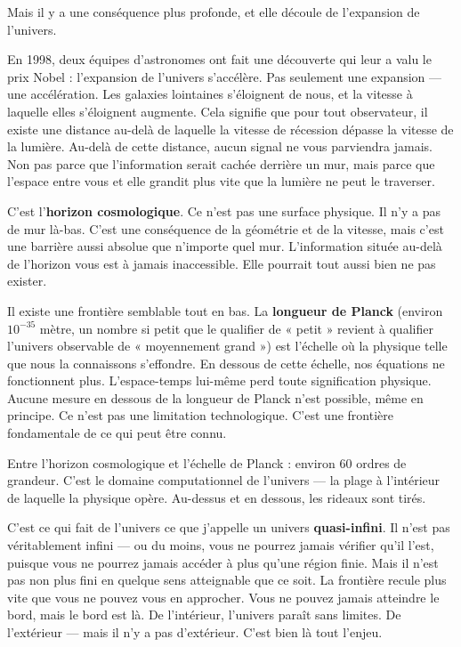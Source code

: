\documentclass[11pt, twoside, openright]{book}
\begin{document}
Mais il y a une conséquence plus profonde, et elle découle de l'expansion de l'univers.

En 1998, deux équipes d'astronomes ont fait une découverte qui leur a valu le prix Nobel : l'expansion de l'univers s'accélère. Pas seulement une expansion --- une accélération. Les galaxies lointaines s'éloignent de nous, et la vitesse à laquelle elles s'éloignent augmente. Cela signifie que pour tout observateur, il existe une distance au-delà de laquelle la vitesse de récession dépasse la vitesse de la lumière. Au-delà de cette distance, aucun signal ne vous parviendra jamais. Non pas parce que l'information serait cachée derrière un mur, mais parce que l'espace entre vous et elle grandit plus vite que la lumière ne peut le traverser.

C'est l'\textbf{horizon cosmologique}. Ce n'est pas une surface physique. Il n'y a pas de mur là-bas. C'est une conséquence de la géométrie et de la vitesse, mais c'est une barrière aussi absolue que n'importe quel mur. L'information située au-delà de l'horizon vous est à jamais inaccessible. Elle pourrait tout aussi bien ne pas exister.

Il existe une frontière semblable tout en bas. La \textbf{longueur de Planck} (environ $10^{-35}$ mètre, un nombre si petit que le qualifier de « petit » revient à qualifier l'univers observable de « moyennement grand ») est l'échelle où la physique telle que nous la connaissons s'effondre. En dessous de cette échelle, nos équations ne fonctionnent plus. L'espace-temps lui-même perd toute signification physique. Aucune mesure en dessous de la longueur de Planck n'est possible, même en principe. Ce n'est pas une limitation technologique. C'est une frontière fondamentale de ce qui peut être connu.

Entre l'horizon cosmologique et l'échelle de Planck : environ 60 ordres de grandeur. C'est le domaine computationnel de l'univers --- la plage à l'intérieur de laquelle la physique opère. Au-dessus et en dessous, les rideaux sont tirés.

C'est ce qui fait de l'univers ce que j'appelle un univers \textbf{quasi-infini}. Il n'est pas véritablement infini --- ou du moins, vous ne pourrez jamais vérifier qu'il l'est, puisque vous ne pourrez jamais accéder à plus qu'une région finie. Mais il n'est pas non plus fini en quelque sens atteignable que ce soit. La frontière recule plus vite que vous ne pouvez vous en approcher. Vous ne pouvez jamais atteindre le bord, mais le bord est là. De l'intérieur, l'univers paraît sans limites. De l'extérieur --- mais il n'y a pas d'extérieur. C'est bien là tout l'enjeu.
\end{document}
